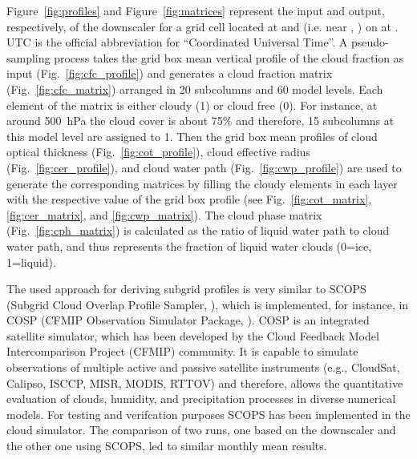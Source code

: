 Figure~\ref{fig:profiles} and Figure~\ref{fig:matrices} 
represent the input and output, respectively, of the downscaler
for a grid cell located at {\longitude} and {\latitude} (i.e. near {\gccity}, {\gcland})
on {\gcdate} at {\gchour}. UTC is the official abbreviation for ``Coordinated Universal Time''.
A pseudo-sampling process takes the grid box mean vertical profile of the cloud fraction as input 
(Fig.~\ref{fig:cfc_profile}) and generates a cloud fraction matrix 
(Fig.~\ref{fig:cfc_matrix}) arranged in 20 subcolumns and 60 model levels.
Each element of the matrix is either cloudy (1) or cloud free (0).
For instance, at around 500~hPa the cloud cover is about 75\% and therefore,
15 subcolumns at this model level are assigned to 1.
Then the grid box mean profiles of cloud optical thickness (Fig.~\ref{fig:cot_profile}),
cloud effective radius (Fig.~\ref{fig:cer_profile}), 
and cloud water path (Fig.~\ref{fig:cwp_profile}) are used
to generate the corresponding matrices by filling the cloudy elements
in each layer with the respective value of the grid box profile 
(see Fig.~\ref{fig:cot_matrix}, \ref{fig:cer_matrix}, and \ref{fig:cwp_matrix}).
The cloud phase matrix (Fig.~\ref{fig:cph_matrix}) is calculated as the ratio
of liquid water path to cloud water path, and thus represents 
the fraction of liquid water clouds (0=ice, 1=liquid).

The used approach for deriving subgrid profiles is very similar to
SCOPS (Subgrid Cloud Overlap Profile Sampler, \citet{Webb2001}),
which is implemented, for instance, in COSP (CFMIP Observation Simulator
Package, \cite{Bodas2011}).
COSP is an integrated satellite simulator, which has been developed by 
the Cloud Feedback Model Intercomparison Project (CFMIP) community.
It is capable to simulate observations of multiple active and passive
satellite instruments (e.g., CloudSat, Calipso, ISCCP, MISR, MODIS, RTTOV) 
and therefore, allows the quantitative evaluation of clouds, humidity,
and precipitation processes in diverse numerical models.
For testing and verifcation purposes SCOPS has been implemented in the cloud simulator. 
The comparison of two runs, one based on the downscaler and the other one using SCOPS,
led to similar monthly mean results.






